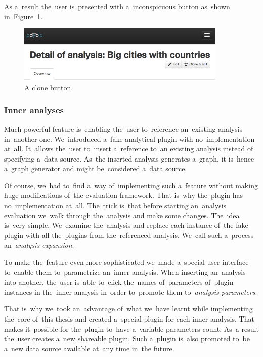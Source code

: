 As a~result the~user is~presented with a~inconspicuous button as~shown in~Figure~\ref{fig:clone-button}.

\begin{figure}
	\centering
	\includegraphics[width=100mm]{img/clone-button.png}
	\caption{A clone button.}
	\label{fig:clone-button}
\end{figure}

\subsubsection{Inner analyses}
Much powerful feature is~enabling the~user to~reference an~existing analysis in~another one. We~introduced a~fake analytical plugin with no~implementation at~all. It~allows the~user to~insert a~reference to~an existing analysis instead 
of specifying a~data source. As~the inserted analysis generates a~graph, 
it is~hence a~graph generator and might be~considered a~data source.

Of course, we~had to~find a~way of~implementing such a~feature without 
making huge modifications of~the evaluation framework. That is~why the~plugin 
has no~implementation at~all. The~trick is~that before starting an~analysis 
evaluation we~walk through the~analysis and make some changes. The~idea is~very 
simple. We~examine the~analysis and replace each instance of~the fake plugin 
with all the~plugins from the~referenced analysis. We~call such a~process an~\emph{analysis expansion}.

To make the~feature even more sophisticated we~made a~special user interface to~enable them to~parametrize an~inner analysis. When inserting an~analysis into 
another, the~user is~able to~click the~names of~parameters of~plugin instances 
in the~inner analysis in~order to~promote them to~\emph{analysis parameters}.

That is~why we~took an~advantage of~what we~have learnt while implementing the~core of~this thesis and created a~special plugin for each inner analysis. That 
makes it~possible for the~plugin to~have a~variable parameters count. As~a result the~user creates a~new shareable plugin. Such a~plugin is~also promoted to~be a~new 
data source available at~any time in~the future.

